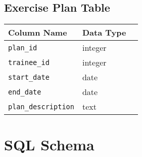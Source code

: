\documentclass{article}
\begin{document}
\subsection*{Exercise Plan Table}

\begin{tabular}{lll}
\toprule
Column Name & Data Type  \\
\midrule
\verb!plan_id! & integer  \\
\verb!trainee_id! & integer  \\
\verb!start_date! & date \\
\verb!end_date! & date \\
\verb!plan_description! & text \
\bottomrule
\end{tabular}

\section{SQL Schema}
\end{document}
